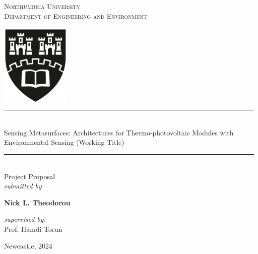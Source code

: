 \documentclass[11pt,twoside]{report}
\newcommand{\horrule}[1]{\rule{\linewidth}{#1}}
\begin{document}
	\begin{titlepage}
	\centering
	\Large
	\textsc{Northumbria University \\ Department of Engineering and Environment} \\ \vspace*{1\baselineskip}
	
	\includegraphics[width=0.25\textwidth,height=0.25\textheight,keepaspectratio]{uj_logo.png}
	
	\horrule{0.5pt} \\[0.4cm] %
	\Huge  Sensing Metasurfaces: Architectures for Thermo-photovoltaic Modules with Environmental Sensing (Working Title) \\ %
	\horrule{2pt} \\[0.5cm] %
	
	\Large{Project Proposal \\ \textit{submitted by}}  %
	\vspace*{1\baselineskip}
	
	\LARGE \textbf{Nick L. Theodorou} \\
		\vspace*{1\baselineskip}

	\Large{\textit{supervised by:} \\ Prof. Hamdi Torun \\}
		
	\vspace*{2\baselineskip}
	\Large{Newcastle, 2024}
	
    \end{titlepage}

    

\end{document}
